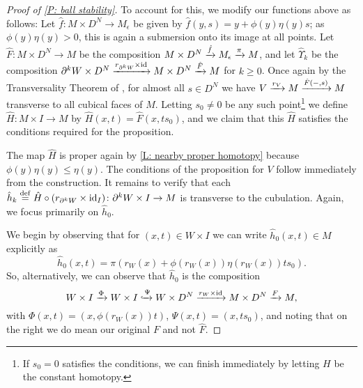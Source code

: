 \begin{proof}[Proof of \cref{P: ball stability}]
	To account for this, we modify our functions above as follows: Let $\hat f \colon M \times D^N \to M_\epsilon$ be given by $\hat f(y, s) = y + \phi(y) \eta(y) s$; as $\phi(y)\eta(y)>0$, this is again a submersion onto its image at all points.
	Let $\hat F \colon M \times D^N \to M$ be the composition $M \times D^N \xrightarrow{\hat f}M_\epsilon \xrightarrow{\pi}M$, and let $\hat \Upsilon_k$ be the composition $\partial^kW \times D^N \xrightarrow{r_{\partial^kW} \times \mathrm{id}}M \times D^N \xrightarrow{\hat F} M$ for $k\geq 0$.
	Once again by the Transversality Theorem of \cite[Section 2.3]{GuPo74}, for almost all $s \in D^N$ we have $V \xrightarrow{r_V} M \xrightarrow{\hat F(-,s)} M$ transverse to all cubical faces of $M$.
	Letting $s_0 \neq 0$ be any such point\footnote{If $s_0 = 0$ satisfies the conditions, we can finish immediately by letting $H$ be the constant homotopy.} we define $\hat H \colon M \times I \to M$ by $\hat H(x,t) = \hat F(x,ts_0)$, and we claim that this $\hat H$ satisfies the conditions required for the proposition.

	The map $\hat H$ is proper again by \cref{L: nearby proper homotopy} because $\phi(y) \eta(y) \leq \eta(y)$.
	The conditions of the proposition for $V$ follow immediately from the construction.
	It remains to verify that each $\hat h_k \stackrel{\mathrm{def}}{=} \hat H \circ (r_{\partial^k W} \times \mathrm{id}_I) \colon \partial^k W \times I \to M$ is transverse to the cubulation.
	Again, we focus primarily on $\hat h_0$.

	\begin{comment}
		Note: we are not claiming an analogue of the third condition above holds for $\hat F$, nor do we need to.
		As we already know from the second condition of the proposition that $\hat h(-,1)$ is transverse to the cubulation and from the hypotheses that $\hat h(-,0)$ is transverse to the cubulation on $W$, it suffices to demonstrated transversality to the cubulation on the restriction of $\hat h$ to $W \times (0,1)$.
	\end{comment}

	We begin by observing that for $(x,t) \in W \times I$ we can write $\hat h_0(x,t) \in M$ explicitly as
	$$\hat h_0(x,t) = \pi(r_W(x)+\phi(r_W(x))\eta(r_W(x))ts_0).$$
	So, alternatively, we can observe that $\hat h_0$ is the composition
	\begin{equation}\label{E: alt hat h}
		W \times I \xrightarrow{\Phi} W \times I \xhookrightarrow{\Psi} W \times D^N \xrightarrow{r_W \times \mathrm{id}} M \times D^N \xrightarrow{F} M,
	\end{equation}
	with $\Phi(x,t) = (x,\phi(r_W(x))t)$, $\Psi(x,t) = (x,ts_0)$, and noting that on the right we do mean our original $F$ and not $\hat F$.


\end{proof}
